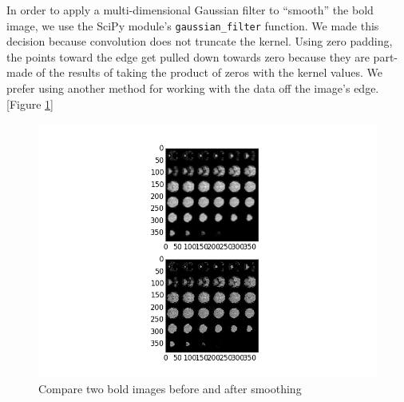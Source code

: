 \par \indent In order to apply a multi-dimensional Gaussian filter to ``smooth''
the bold image, we use the SciPy module's \texttt{gaussian\_filter} function. 
We made this decision because convolution does not truncate the kernel. Using
zero padding, the points toward the edge get pulled down towards zero because
they are part-made of the results of taking the product of zeros with the kernel
values. We prefer using another method for working with the data off the image's
edge. [Figure \ref{fig:smoothing}]

\begin{figure}[!ht]
\centering
\includegraphics[width=120mm]{images/smooth_fig.png}
\caption{Compare two bold images before and after smoothing}
\label{fig:smoothing}
\end{figure}
